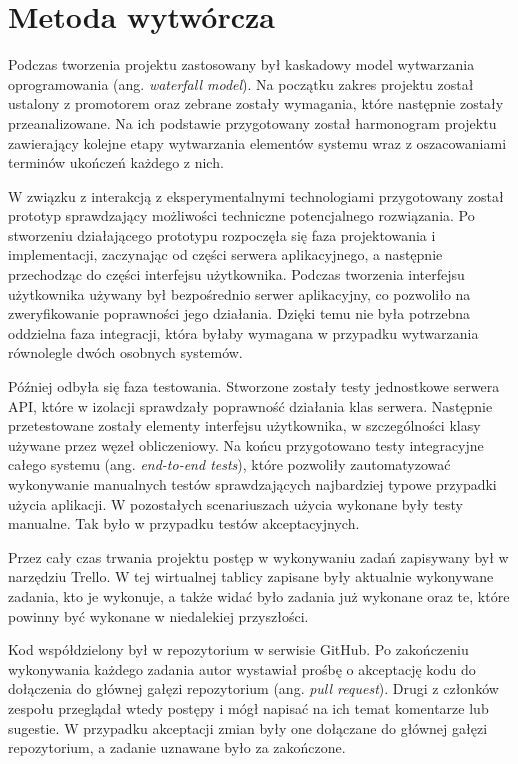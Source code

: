 \documentclass[a4paper,11pt,twoside]{report}
\theoremstyle{definition}
\begin{document}
\section{Metoda wytwórcza}
    \label{metoda-wytworcza}
    
    Podczas tworzenia projektu zastosowany był kaskadowy model wytwarzania oprogramowania (ang. \textit{waterfall model}).
    Na początku zakres projektu został ustalony z promotorem oraz zebrane zostały wymagania, które następnie zostały przeanalizowane.
    Na ich podstawie przygotowany został harmonogram projektu zawierający kolejne etapy wytwarzania elementów systemu
    wraz z oszacowaniami terminów ukończeń każdego z nich.
    
    W związku z interakcją z eksperymentalnymi technologiami przygotowany został prototyp
    sprawdzający możliwości techniczne potencjalnego rozwiązania.
    Po stworzeniu działającego prototypu rozpoczęła się faza projektowania i implementacji, zaczynając od części serwera aplikacyjnego,
    a następnie przechodząc do części interfejsu użytkownika.
    Podczas tworzenia interfejsu użytkownika używany był bezpośrednio serwer aplikacyjny, co pozwoliło na zweryfikowanie
    poprawności jego działania.
    Dzięki temu nie była potrzebna oddzielna faza integracji, która byłaby wymagana w przypadku wytwarzania
    równolegle dwóch osobnych systemów.
    
    Później odbyła się faza testowania.
    Stworzone zostały testy jednostkowe serwera API, które w izolacji sprawdzały poprawność działania klas serwera.
    Następnie przetestowane zostały elementy interfejsu użytkownika, w szczególności klasy używane przez węzeł obliczeniowy.
    Na końcu przygotowano testy integracyjne całego systemu (ang. \textit{end-to-end tests}),
    które pozwoliły zautomatyzować wykonywanie manualnych testów sprawdzających najbardziej typowe przypadki
    użycia aplikacji.
    W pozostałych scenariuszach użycia wykonane były testy manualne.
    Tak było w przypadku testów akceptacyjnych.
    
    Przez cały czas trwania projektu postęp w wykonywaniu zadań zapisywany był w narzędziu Trello.
    W tej wirtualnej tablicy zapisane były aktualnie wykonywane zadania, kto je wykonuje, a także
    widać było zadania już wykonane oraz te, które powinny być wykonane w niedalekiej przyszłości.
    
    Kod współdzielony był w repozytorium w serwisie GitHub.
    Po zakończeniu wykonywania każdego zadania autor wystawiał prośbę o akceptację kodu do dołączenia
    do głównej gałęzi repozytorium (ang. \textit{pull request}).
    Drugi z członków zespołu przeglądał wtedy postępy i mógł napisać na ich temat komentarze lub sugestie.
    W przypadku akceptacji zmian były one dołączane do głównej gałęzi repozytorium, a zadanie uznawane było
    za zakończone.
    
\end{document}

